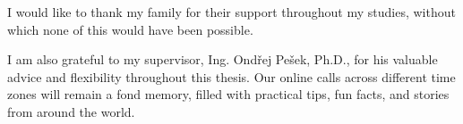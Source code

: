 \begin{acknowledgements}
\vspace{0.4cm}
I would like to thank my family for their support throughout my studies, without which none of this would have been possible.

I am also grateful to my supervisor, Ing. Ondřej Pešek, Ph.D., for his valuable advice and flexibility throughout this thesis. Our online calls across different time zones will remain a fond memory, filled with practical tips, fun facts, and stories from around the world.
\end{acknowledgements}
\clearpage